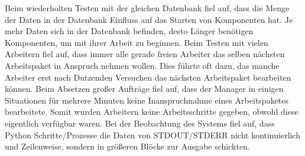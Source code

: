 \begin{description}
        Beim wiederholten Testen mit der gleichen Datenbank fiel auf, dass die Menge der Daten in der Datenbank Einfluss auf das Starten von Komponenten hat. Je mehr Daten sich in der Datenbank befinden, desto Länger benötigen Komponenten, um mit ihrer Arbeit zu beginnen.
        Beim Testen mit vielen Arbeitern fiel auf, dass immer alle gerade freien Arbeiter das selben nächsten Arbeitspaket in Anspruch nehmen wollen. Dies führte oft dazu, das manche Arbeiter erst nach Dutzenden Versuchen das nächsten Arbeitspaket bearbeiten können.
        Beim Absetzen großer Aufträge fiel auf, dass der Manager in einigen Situationen für mehrere Minuten keine Inanspruchnahme eines Arbeitspaketes bearbeitete. Somit wurden Arbeitern keine Arbeitsschritte gegeben, obwohl diese eigentlich verfügbar waren.
        Bei der Beobachtung des Systems fiel auf, dass Python Schritte/Prozesse
        die Daten von STDOUT/STDERR nicht kontinuierlich und Zeilenweise,
        sondern in größeren Blöcke zur Ausgabe schickten.
\end{description}

